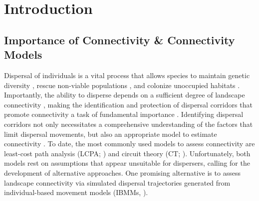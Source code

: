 \documentclass[abstract=on,10pt,a4paper,bibliography=totocnumbered]{article}
\begin{document}
\newpage

\onehalfspacing
\tableofcontents
\doublespacing

\newpage
{}


\section{Introduction}

\subsection{Importance of Connectivity \& Connectivity Models}
Dispersal of individuals is a vital process that allows species to maintain
genetic diversity \citep{Perrin.1999, Perrin.2000, Frankham.2002, Leigh.2012,
Baguette.2013}, rescue non-viable populations \citep{Brown.1977}, and colonize
unoccupied habitats \citep{Hanski.1999b, MacArthur.2001}. Importantly, the
ability to disperse depends on a sufficient degree of landscape connectivity
\citep{Fahrig.2003, Clobert.2012}, making the identification and protection of
dispersal corridors that promote connectivity a task of fundamental importance
\citep{Nathan.2008, Doerr.2011, Rudnick.2012}. Identifying dispersal corridors
not only necessitates a comprehensive understanding of the factors that limit
dispersal movements, but also an appropriate model to estimate connectivity
\citep{Baguette.2013, Vasudev.2015, Hofmann.2021}. To date, the most commonly
used models to assess connectivity are least-cost path analysis (LCPA;
\citealp{Adriaensen.2003}) and circuit theory (CT; \citealp{McRae.2006,
McRae.2008}). Unfortunately, both models rest on assumptions that appear
unsuitable for dispersers, calling for the development of alternative
approaches. One promising alternative is to assess landscape connectivity via
simulated dispersal trajectories generated from individual-based movement models
(IBMMs, \citep{Diniz.2019}).

\end{document}
